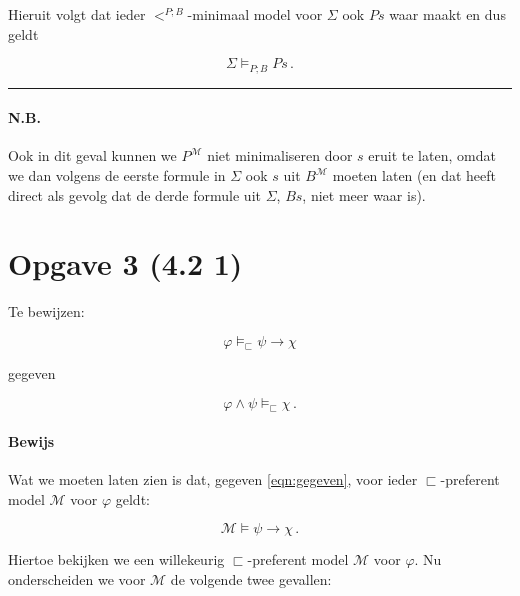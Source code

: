 \documentclass[a4paper,11pt]{article}
\begin{document}
\begin{enumerate}
Hieruit volgt dat ieder $<^{P;B}$-minimaal model voor $\Sigma$ ook $Ps$ waar
maakt en dus geldt

\begin{displaymath}
\Sigma \vDash_{P;B} Ps \, \mbox{.}
\end{displaymath}

\hfill\rule{2.1mm}{2.mm}

\paragraph{N.B.}

Ook in dit geval kunnen we $P^{\mathcal{M}}$ niet minimaliseren door $s$ eruit
te laten, omdat we dan volgens de eerste formule in $\Sigma$ ook $s$ uit
$B^{\mathcal{M}}$ moeten laten (en dat heeft direct als gevolg dat de derde
formule uit $\Sigma$, $Bs$, niet meer waar is).


\end{enumerate}


\section*{Opgave 3 (4.2 1)}

Te bewijzen:

\begin{displaymath}
\varphi \vDash_{\sqsubset} \psi \rightarrow \chi
\end{displaymath}

gegeven

\begin{equation}\label{eqn:gegeven}
\varphi \wedge \psi \vDash_{\sqsubset} \chi \, \mbox{.}
\end{equation}

\paragraph{Bewijs}

Wat we moeten laten zien is dat, gegeven \ref{eqn:gegeven},  voor ieder
$\sqsubset$-preferent model $\mathcal{M}$ voor $\varphi$ geldt:

\begin{displaymath}
\mathcal{M} \vDash \psi \rightarrow \chi \, \mbox{.}
\end{displaymath}

Hiertoe bekijken we een willekeurig $\sqsubset$-preferent model
$\mathcal{M}$ voor $\varphi$. Nu onderscheiden we voor $\mathcal{M}$ de
volgende twee gevallen:
\end{document}
